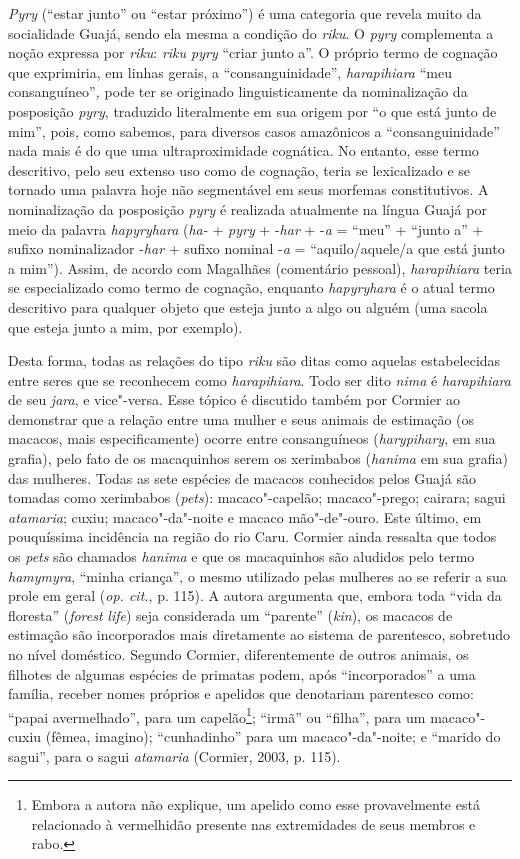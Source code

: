 \emph{Pyry} (``estar junto'' ou ``estar próximo'') é uma categoria que
revela muito da socialidade Guajá, sendo ela mesma a condição do
\emph{riku}. O \emph{pyry} complementa a noção expressa por \emph{riku}:
\emph{riku pyry} ``criar junto a''. O próprio termo de cognação que
exprimiria, em linhas gerais, a ``consanguinidade'', \emph{harapihiara}
``meu consanguíneo''\emph{,} pode ter se originado linguisticamente da
nominalização da posposição \emph{pyry}, traduzido literalmente em sua
origem por ``o que está junto de mim'', pois, como sabemos, para diversos
casos amazônicos a ``consanguinidade'' nada mais é do que uma
ultraproximidade cognática. No entanto, esse termo descritivo, pelo seu
extenso uso como de cognação, teria se lexicalizado e se tornado uma
palavra hoje não segmentável em seus morfemas constitutivos. A
nominalização da posposição \emph{pyry} é realizada atualmente na língua
Guajá por meio da palavra \emph{hapyryhara} (\emph{ha-} + \emph{pyry} +
-\emph{har} + -\emph{a} = ``meu'' + ``junto a'' + sufixo nominalizador
-\emph{har} + sufixo nominal -\emph{a} = ``aquilo/aquele/a que
está junto a mim''). Assim, de acordo com Magalhães (comentário
pessoal), \emph{harapihiara} teria se especializado como termo de
cognação, enquanto \emph{hapyryhara} é o atual termo descritivo para
qualquer objeto que esteja junto a algo ou alguém (uma sacola que esteja
junto a mim, por exemplo).

Desta forma, todas as relações do tipo \emph{riku} são ditas como
aquelas estabelecidas entre seres que se reconhecem como
\emph{harapihiara}. Todo ser dito \emph{nima} é \emph{harapihiara} de
seu \emph{jara}, e vice"-versa. Esse tópico é discutido também por
Cormier ao demonstrar que a relação entre uma mulher e seus animais de
estimação (os macacos, mais especificamente) ocorre entre consanguíneos
(\emph{harypihary}, em sua grafia), pelo fato de os macaquinhos serem os
xerimbabos (\emph{hanima} em sua grafia) das mulheres. Todas as sete
espécies de macacos conhecidos pelos Guajá são tomadas como xerimbabos
(\emph{pets}): macaco"-capelão; macaco"-prego; cairara; sagui
\emph{atamaria}; cuxiu; macaco"-da"-noite e macaco mão"-de"-ouro. Este
último, em pouquíssima incidência na região do rio Caru. Cormier ainda
ressalta que todos os \emph{pets} são chamados \emph{hanima} e que os
macaquinhos são aludidos pelo termo \emph{hamymyra}, ``minha criança'', o
mesmo utilizado pelas mulheres ao se referir a sua prole em geral (\emph{op.
cit.}, p. 115). A autora argumenta que, embora toda ``vida da floresta''
(\emph{forest} \emph{life}) seja considerada um ``parente'' (\emph{kin}),
os macacos de estimação são incorporados mais diretamente ao sistema de
parentesco, sobretudo no nível doméstico. Segundo Cormier,
diferentemente de outros animais, os filhotes de algumas espécies de
primatas podem, após ``incorporados'' a uma família, receber nomes
próprios e apelidos que denotariam parentesco como: ``papai avermelhado'',
para um capelão\footnote{Embora a autora não explique, um apelido como
  esse provavelmente está relacionado à vermelhidão presente nas
  extremidades de seus membros e rabo.}; ``irmã'' ou ``filha'', para um
macaco"-cuxiu (fêmea, imagino); ``cunhadinho'' para um macaco"-da"-noite; e
``marido do sagui'', para o sagui \emph{atamaria} (Cormier, 2003, p. 115).

